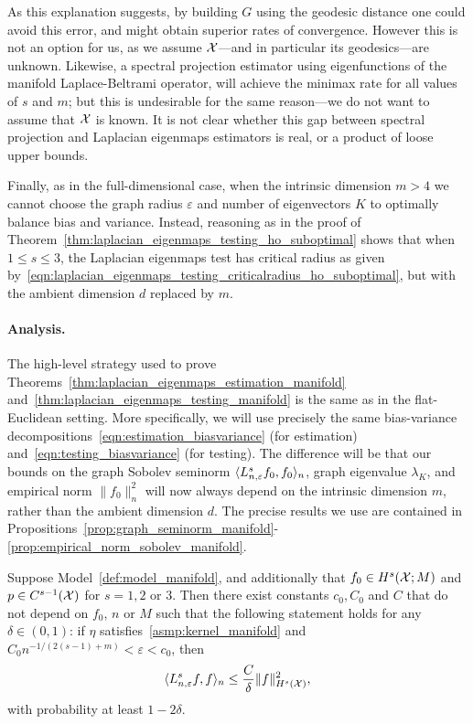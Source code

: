 As this explanation suggests, by building $G$ using the geodesic distance one could avoid this error, and might obtain superior rates of convergence. However this is not an option for us, as we assume $\mathcal{X}$---and in particular its geodesics---are unknown. Likewise, a spectral projection estimator using eigenfunctions of the manifold Laplace-Beltrami operator, will achieve the minimax rate for all values of $s$ and $m$; but this is undesirable for the same reason---we do not want to assume that $\mathcal{X}$ is known. It is not clear whether this gap between spectral projection and Laplacian eigenmaps estimators is real, or a product of loose upper bounds. 

Finally, as in the full-dimensional case, when the intrinsic dimension $m > 4$ we cannot choose the graph radius $\varepsilon$ and number of eigenvectors $K$ to optimally balance bias and variance.  Instead, reasoning as in the proof of Theorem~\ref{thm:laplacian_eigenmaps_testing_ho_suboptimal} shows that when $1 \leq s \leq 3$, the Laplacian eigenmaps test has critical radius as given by~\eqref{eqn:laplacian_eigenmaps_testing_criticalradius_ho_suboptimal}, but with the ambient dimension $d$ replaced by $m$.

\paragraph{Analysis.}
The high-level strategy used to prove Theorems~\ref{thm:laplacian_eigenmaps_estimation_manifold} and~\ref{thm:laplacian_eigenmaps_testing_manifold} is the same as in the flat-Euclidean setting. More specifically, we will use precisely the same bias-variance decompositions~\eqref{eqn:estimation_biasvariance} (for estimation) and~\eqref{eqn:testing_biasvariance} (for testing). The difference will be that our bounds on the graph Sobolev seminorm $\langle L_{n,\varepsilon}^sf_0, f_0 \rangle_n$, graph eigenvalue $\lambda_K$, and empirical norm $\|f_0\|_n^2$ will now always depend on the intrinsic dimension $m$, rather than the ambient dimension $d$. The precise results we use are contained in Propositions~\ref{prop:graph_seminorm_manifold}-\ref{prop:empirical_norm_sobolev_manifold}.
\begin{proposition}
	\label{prop:graph_seminorm_manifold} 
	Suppose Model~\ref{def:model_manifold}, and additionally that $f_0 \in H^s(\mathcal{X};M)$ and $p \in C^{s - 1}(\mathcal{X})$ for $s = 1,2$ or $3$. Then there exist constants $c_0,C_0$ and $C$ that do not depend on $f_0$, $n$ or $M$ such that the following statement holds for any $\delta \in (0,1)$: if $\eta$ satisfies~\ref{asmp:kernel_manifold} and $C_0n^{-1/(2(s - 1) + m)} < \varepsilon < c_0$, then
	\begin{equation}
	\label{eqn:graph_seminorm_manifold}
	\langle L_{n,\varepsilon}^s f, f \rangle_n \leq \frac{C}{\delta} \|f\|_{H^s(\mathcal{X})}^2,
	\end{equation}
	with probability at least $1 - 2\delta$.
\end{proposition}

